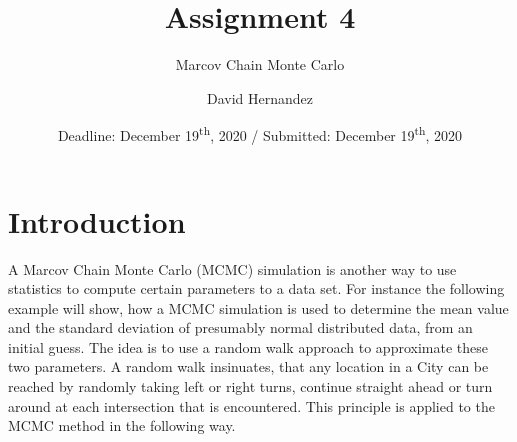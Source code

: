 \documentclass{aa}
\begin{document}

\let\origthelstnumber\thelstnumber
\makeatletter
\newcommand*\Suppressnumber{%
  \lst@AddToHook{OnNewLine}{%
    \let\thelstnumber\relax%
     \advance\c@lstnumber-\@ne\relax%
    }%
}

\newcommand*\Reactivatenumber[1]{%
  \setcounter{lstnumber}{\numexpr#1-1\relax}
  \lst@AddToHook{OnNewLine}{%
   \let\thelstnumber\origthelstnumber%
   \refstepcounter{lstnumber}
  }%
}

\title{Assignment 4}

\subtitle{Marcov Chain Monte Carlo}

\author{David Hernandez}



\date{Deadline: December 19\textsuperscript{th}, 2020 / Submitted: December
19\textsuperscript{th}, 2020}

\abstract{}

\maketitle

\section{Introduction}%
\label{sec:introduction}

A Marcov Chain Monte Carlo (MCMC) simulation is another way to use statistics to compute
certain parameters to a data set. For instance the following example will show, how a MCMC
simulation is used to determine the mean value and the standard deviation of presumably normal
distributed data, from an initial guess. The idea is to use a random walk approach to
approximate these two parameters. A random walk insinuates, that any location in a City can be
reached by randomly taking left or right turns, continue straight ahead or turn around at each
intersection that is encountered. This principle is applied to the MCMC method in the following
way.
\end{document}
